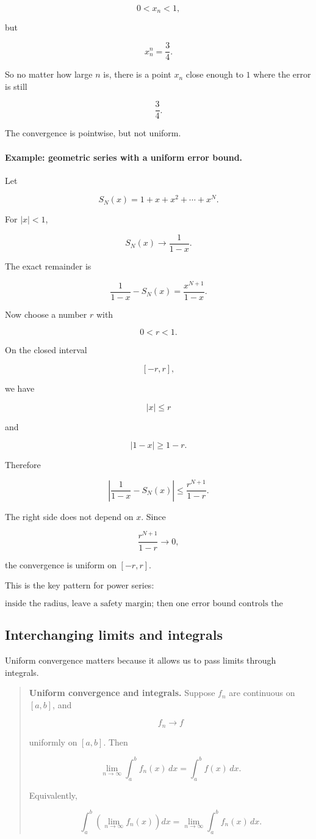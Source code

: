 \[
0<x_n<1,
\]

but

\[
x_n^n=\frac34.
\]

So no matter how large \(n\) is, there is a point \(x_n\) close enough to \(1\) where the
error is still

\[
\frac34.
\]

The convergence is pointwise, but not uniform.

\paragraph{Example: geometric series with a uniform error bound.}
Let

\[
S_N(x)=1+x+x^2+\cdots+x^N.
\]

For \(|x|<1\),

\[
S_N(x)\to \frac1{1-x}.
\]

The exact remainder is

\[
\frac1{1-x}-S_N(x)
=
\frac{x^{N+1}}{1-x}.
\]

Now choose a number \(r\) with

\[
0<r<1.
\]

On the closed interval

\[
[-r,r],
\]

we have

\[
|x|\le r
\]

and

\[
|1-x|\ge 1-r.
\]

Therefore

\[
\left|
\frac1{1-x}-S_N(x)
\right|
\le
\frac{r^{N+1}}{1-r}.
\]

The right side does not depend on \(x\).  Since

\[
\frac{r^{N+1}}{1-r}\to0,
\]

the convergence is uniform on \([-r,r]\).

This is the key pattern for power series:

\[
\boxed{
\text{inside the radius, leave a safety margin; then one error bound controls the interval.}
}
\]

\subsection{Interchanging limits and integrals}
\label{subsec:interchanging-limits-integrals}

Uniform convergence matters because it allows us to pass limits through integrals.

\begin{quote}
\textbf{Uniform convergence and integrals.}
Suppose \(f_n\) are continuous on \([a,b]\), and

\[
f_n\to f
\]

uniformly on \([a,b]\).  Then

\[
\boxed{
\lim_{n\to\infty}\int_a^b f_n(x)\,dx
=
\int_a^b f(x)\,dx.
}
\]

Equivalently,

\[
\boxed{
\int_a^b \left(\lim_{n\to\infty} f_n(x)\right)dx
=
\lim_{n\to\infty}\int_a^b f_n(x)\,dx.
}
\]
\end{quote}

